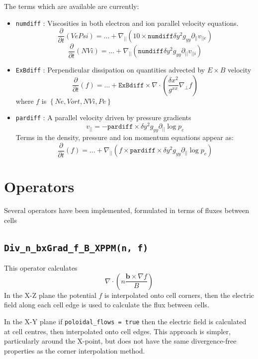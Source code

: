 \documentclass[12pt,a4paper]{article}
\begin{document}
The terms which are available are currently:
\begin{itemize}
\item \texttt{numdiff} : Viscosities in both electron and ion parallel velocity equations.
  \[
  \frac{\partial}{\partial t} \left(VePsi\right) = \ldots + \nabla_{||}\left(10\times\texttt{numdiff}\delta y^2g_{yy}\partial_{||}v_{||e}\right)
  \]
  \[
  \frac{\partial}{\partial t} \left(NVi\right) = \ldots + \nabla_{||}\left(\texttt{numdiff}\delta y^2g_{yy}\partial_{||}v_{||i}\right)
  \]
\item \texttt{ExBdiff} : Perpendicular dissipation on quantities advected by $E\times B$ velocity
  \[
  \frac{\partial}{\partial t} \left(f\right) = \ldots + \texttt{ExBdiff}\times\nabla\cdot\left(\frac{\delta x^2}{g^{xx}} \nabla_\perp f\right)
  \]
  where $f$ is $\left\{Ne, Vort, NVi, Pe\right\}$
\item \texttt{pardiff} : A parallel velocity driven by pressure gradients
  \[
  v_{||} = -\texttt{pardiff}\times \delta y^2g_{yy}\partial_{||}\log p_e
  \]
  Terms in the density, pressure and ion momentum equations appear as:
  \[
  \frac{\partial}{\partial t} \left(f\right) = \ldots + \nabla_{||}\left(f \times \texttt{pardiff}\times \delta y^2g_{yy}\partial_{||}\log p_e\right)
  \]
\end{itemize}

\section{Operators}
\label{sec:operators}

Several operators have been implemented, formulated in terms of fluxes between cells

\subsection{\texttt{Div\_n\_bxGrad\_f\_B\_XPPM(n, f)}}

This operator calculates 
\[
\nabla\cdot\left(n\frac{\mathbf{b}\times\nabla f}{B}\right)
\]
In the X-Z plane the potential $f$ is interpolated onto cell corners, 
then the electric field along each cell edge is used to calculate the flux
between cells.

In the X-Y plane if \texttt{poloidal\_flows = true} then the electric
field is calculated at cell centres, then interpolated onto cell edges.
This approach is simpler, particularly around the X-point, but does not 
have the same divergence-free properties as the corner interpolation method.
\end{document}
